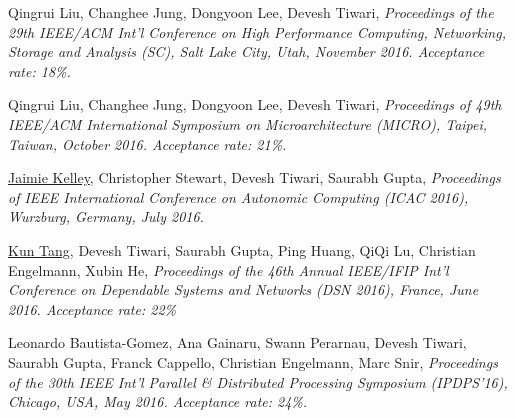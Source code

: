 {\textnormal{\newline Qingrui Liu, Changhee Jung, Dongyoon Lee, Devesh Tiwari,}} {\textit{Proceedings of the 29th IEEE/ACM Int'l Conference on High Performance Computing, Networking, Storage and Analysis (SC), Salt Lake City, Utah, November 2016. Acceptance rate: 18\%.\newline}}{}{}{} %


{\textnormal{\newline Qingrui Liu, Changhee Jung, Dongyoon Lee, Devesh Tiwari,}} {\textit{Proceedings of 49th IEEE/ACM International Symposium on Microarchitecture (MICRO), Taipei, Taiwan, October 2016. Acceptance rate: 21\%.\newline}}{}{}{} %

{\textnormal{\newline \underline{Jaimie Kelley}, Christopher Stewart, Devesh Tiwari, Saurabh Gupta,}} {\textit{Proceedings of IEEE International Conference on Autonomic Computing (ICAC 2016), Wurzburg, Germany, July 2016.\newline}}{}{}{} %

{\textnormal{\newline \underline{Kun Tang}, Devesh Tiwari, Saurabh Gupta, Ping Huang, QiQi Lu, Christian Engelmann, Xubin He,}} {\textit{Proceedings of the 46th Annual IEEE/IFIP Int’l Conference on Dependable Systems and Networks (DSN 2016), France, June 2016. Acceptance rate: 22\%\newline}}{}{}{} %


{\textnormal{\newline Leonardo Bautista-Gomez, Ana Gainaru, Swann Perarnau, Devesh Tiwari, Saurabh Gupta, Franck Cappello, Christian Engelmann, Marc Snir,}} {\textit{Proceedings of the 30th IEEE Int'l Parallel \& Distributed Processing Symposium (IPDPS'16), Chicago, USA, May 2016. Acceptance rate: 24\%.\newline}}{}{}{} %


